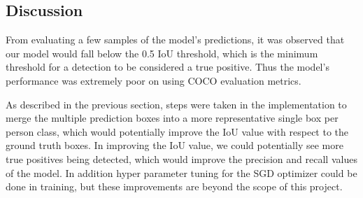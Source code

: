 \subsection{Discussion}

From evaluating a few samples of the model's predictions, it was observed that our model would fall below the 0.5 IoU threshold, which is the minimum threshold for a detection to be considered a true positive.
Thus the model's performance was extremely poor on using COCO evaluation metrics.

As described in the previous section, steps were taken in the implementation to merge the multiple prediction boxes into a more representative single box per person class, which would potentially improve the IoU value with respect to the ground truth boxes.
In improving the IoU value, we could potentially see more true positives being detected, which would improve the precision and recall values of the model.
In addition hyper parameter tuning for the SGD optimizer could be done in training, but these improvements are beyond the scope of this project.
